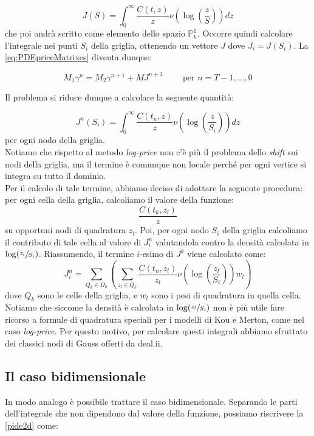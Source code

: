 \documentclass[a4paper,10pt]{report}
\theoremstyle{plain}
\theoremstyle{definition}
\theoremstyle{remark}
\begin{document}
\begin{equation*}
 J(S)=\int_0^\infty \frac{C(t,z)}{z}\nu\left(\log\left(\frac{z}{S}\right) \right)dz
\end{equation*}
che poi andrà scritto come elemento dello spazio $\mathbb{P}_h^1$. Occorre quindi calcolare l'integrale nei punti $S_i$ della griglia, ottenendo un vettore $J$ dove $J_i=J(S_i)$. La \eqref{eq:PDEpriceMatrixes} diventa dunque: 
 
\begin{equation}
 \label{eq:PDEpriceMatrixeswithJ}
 M_1\gamma^n=M_2\gamma^{n+1}+MJ^{n+1} \qquad \text{ per } n=T-1,\dots,0
\end{equation}

Il problema si riduce dunque a calcolare la seguente quantità:

\begin{equation*}
 J^n(S_i)=\int_0^\infty \frac{C(t_n,z)}{z}\nu\left(\log\left(\frac{z}{S_i}\right) \right)dz
\end{equation*}
per ogni nodo della griglia.\\
Notiamo che rispetto al metodo \emph{log-price} non c'è più il problema dello \emph{shift} sui nodi della griglia, ma il termine è comunque non locale perché per ogni vertice si integra su tutto il dominio.\\
Per il calcolo di tale termine, abbiamo deciso di adottare la seguente procedura: per ogni cella della griglia, calcoliamo il valore della funzione: $$\frac{C(t_k,z_l)}{z}$$ su opportuni nodi di quadratura $z_l$. Poi, per ogni nodo $S_i$ della griglia calcoliamo il contributo di tale cella al valore di $J^n_i$ valutandola contro la densità calcolata in $\log(\sfrac{z_l}{S_i})$.
Riassumendo, il termine $i$-esimo di $J^k$ viene calcolato come:
\begin{equation*}
J^n_i=\sum\limits_{Q_k\in \Omega_h}\left( \sum\limits_{z_l\in Q_k}\frac{C(t_n,z_l)}{z_l}\nu\left(\log\left(\frac{z_l}{S_i}\right)\right)w_l\right)
\end{equation*}
dove $Q_k$ sono le celle della griglia, e $w_l$ sono i pesi di quadratura in quella cella. Notiamo che siccome la densità è calcolata in $\log(\sfrac{z_l}{S_i})$ non è più utile fare ricorso a formule di quadratura speciali per i modelli di Kou e Merton, come nel caso \emph{log-price}. Per questo motivo, per calcolare questi integrali abbiamo sfruttato dei classici nodi di Gauss offerti da \textsf{deal.ii}.

\subsection{Il caso bidimensionale}
In modo analogo è possibile trattare il caso bidimensionale. Separando le parti dell'integrale che non dipendono dal valore della funzione, possiamo riscrivere la \eqref{pide2d} come:
\end{document}
